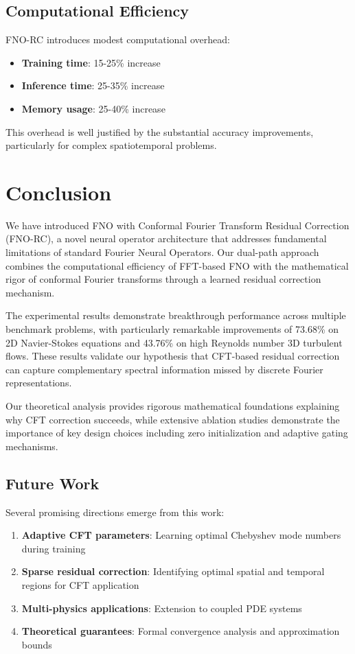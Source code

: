 \documentclass[11pt,twocolumn]{article}
\begin{document}
\subsection{Computational Efficiency}

FNO-RC introduces modest computational overhead:
\begin{itemize}
    \item \textbf{Training time}: 15-25\% increase
    \item \textbf{Inference time}: 25-35\% increase  
    \item \textbf{Memory usage}: 25-40\% increase
\end{itemize}

This overhead is well justified by the substantial accuracy improvements, particularly for complex spatiotemporal problems.

\section{Conclusion}

We have introduced FNO with Conformal Fourier Transform Residual Correction (FNO-RC), a novel neural operator architecture that addresses fundamental limitations of standard Fourier Neural Operators. Our dual-path approach combines the computational efficiency of FFT-based FNO with the mathematical rigor of conformal Fourier transforms through a learned residual correction mechanism.

The experimental results demonstrate breakthrough performance across multiple benchmark problems, with particularly remarkable improvements of 73.68\% on 2D Navier-Stokes equations and 43.76\% on high Reynolds number 3D turbulent flows. These results validate our hypothesis that CFT-based residual correction can capture complementary spectral information missed by discrete Fourier representations.

Our theoretical analysis provides rigorous mathematical foundations explaining why CFT correction succeeds, while extensive ablation studies demonstrate the importance of key design choices including zero initialization and adaptive gating mechanisms.

\subsection{Future Work}

Several promising directions emerge from this work:
\begin{enumerate}
    \item \textbf{Adaptive CFT parameters}: Learning optimal Chebyshev mode numbers during training
    \item \textbf{Sparse residual correction}: Identifying optimal spatial and temporal regions for CFT application
    \item \textbf{Multi-physics applications}: Extension to coupled PDE systems
    \item \textbf{Theoretical guarantees}: Formal convergence analysis and approximation bounds
\end{enumerate}
\end{document}

